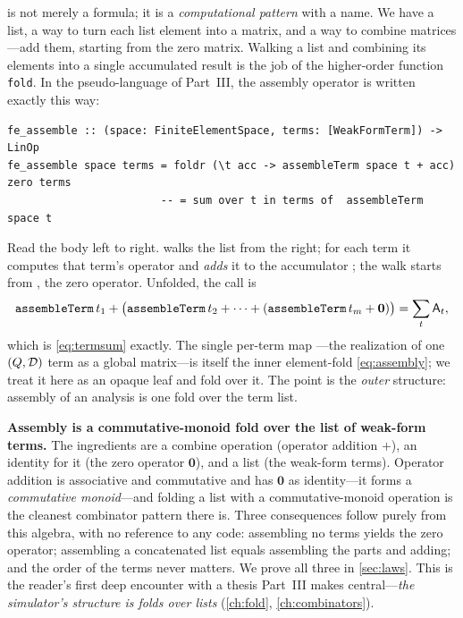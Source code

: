  is not merely a formula; it is a \emph{computational pattern}
with a name. We have a list, a way to turn each list element into a matrix, and a
way to combine matrices---add them, starting from the zero matrix. Walking a list
and combining its elements into a single accumulated result is the job of the
higher-order function \texttt{fold}. In the pseudo-language of Part~III, the
assembly operator  is written exactly this way:
\begin{lstlisting}[style=l4style]
fe_assemble :: (space: FiniteElementSpace, terms: [WeakFormTerm]) -> LinOp
fe_assemble space terms = foldr (\t acc -> assembleTerm space t + acc) zero terms
                        -- = sum over t in terms of  assembleTerm space t
\end{lstlisting}
Read the body left to right.  walks the list  from the
right; for each term  it computes that term's operator
 and \emph{adds} it to the accumulator ;
the walk starts from , the zero operator. Unfolded, the call is
\[
\texttt{assembleTerm}\,t_1+\bigl(\texttt{assembleTerm}\,t_2+\cdots
+(\texttt{assembleTerm}\,t_m+\mathbf 0)\bigr)
=\sum_t\mathsf{A}_t,
\]
which is \cref{eq:termsum} exactly. The single per-term map
---the realization of one $(Q,\mathcal{D})$ term as a
global matrix---is itself the inner element-fold \cref{eq:assembly}; we treat it
here as an opaque leaf and fold over it. The point is the \emph{outer} structure:
assembly of an analysis is one fold over the term list.

\begin{keyidea}
\textbf{Assembly is a commutative-monoid fold over the list of weak-form terms.}
The ingredients are a combine operation (operator addition $+$), an identity for
it (the zero operator $\mathbf 0$), and a list (the weak-form terms). Operator
addition is associative and commutative and has $\mathbf 0$ as identity---it forms
a \emph{commutative monoid}---and folding a list with a commutative-monoid
operation is the cleanest combinator pattern there is. Three consequences follow
purely from this algebra, with no reference to any code: assembling no terms
yields the zero operator; assembling a concatenated list equals assembling the
parts and adding; and the order of the terms never matters. We prove all three in
\cref{sec:laws}. This is the reader's first deep encounter with a thesis Part~III
makes central---\emph{the simulator's structure is folds over lists}
(\cref{ch:fold}, \cref{ch:combinators}).
\end{keyidea}

